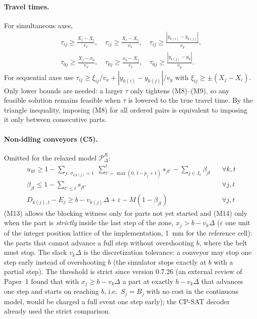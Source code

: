 \documentclass[11pt,a4paper]{article}
\theoremstyle{definition}
\theoremstyle{remark}
\newcommand{\Pb}{\mathcal{P}}
\begin{document}
\paragraph{Travel times.} For simultaneous axes,
\begin{align}
&\tau_{ij}\ge\frac{X_j-X_i}{v_x},\quad \tau_{ij}\ge\frac{X_i-X_j}{v_x},\quad
\tau_{ij}\ge\frac{|y_{k(i)}-y_{k(j)}|}{v_y}, \tag{M10}\\
&\tau_{0j}\ge\frac{X_j-x_0}{v_x},\quad \tau_{0j}\ge\frac{x_0-X_j}{v_x},\quad
\tau_{0j}\ge\frac{|y_{k(j)}-y_0|}{v_y}. \tag{M11}
\end{align}
For sequential axes use $\tau_{ij}\ge\xi_{ij}/v_x+|y_{k(i)}-y_{k(j)}|/v_y$ with
$\xi_{ij}\ge\pm(X_j-X_i)$. Only lower bounds are needed: a larger $\tau$ only tightens
(M8)--(M9), so any feasible solution remains feasible when $\tau$ is lowered to the true
travel time. By the triangle inequality, imposing (M8) for all ordered pairs is
equivalent to imposing it only between consecutive parts.

\paragraph{Non-idling conveyors (C5).} Omitted for the relaxed model $\Pb^R_\Delta$:
\begin{align}
&u_{kt}\ge 1-\sum_{j:\ \sigma_{k\,k(j)}=1}\ \sum_{t'=\max(0,\,t-\bar p_j+1)}^{t}s_{jt'}-\sum_{j\in J_k}\beta_{jt} && \forall k,t \tag{M12}\\
&\beta_{jt}\le 1-\textstyle\sum_{t'\le t}s_{jt'} && \forall j,t \tag{M13}\\
&D_{k(j),t}-E_j\ge b-v_{k(j)}\Delta+\varepsilon-M(1-\beta_{jt}) && \forall j,t \tag{M14}
\end{align}
(M13) allows the blocking witness only for parts not yet started and (M14) only when the
part is \emph{strictly} inside the last step of the zone, $x_j>b-v_k\Delta$ ($\varepsilon$
one unit of the integer position lattice of the implementation, 1~mm for the reference
cell): the parts that cannot advance a full step without
overshooting $b$, where the belt must stop. The slack $v_k\Delta$ is the discretization
tolerance: a conveyor may stop one step early instead of overshooting $b$ (the simulator
stops exactly at $b$ with a partial step). The threshold is strict since version 0.7.26
(an external review of Paper~1 found that with $x_j\ge b-v_k\Delta$ a part at exactly
$b-v_k\Delta$ that advances one step and starts on reaching $b$, i.e.\ $S_j=B_j$ with no
cost in the continuous model, would be charged a full event one step early); the CP-SAT
decoder already used the strict comparison.
\end{document}
